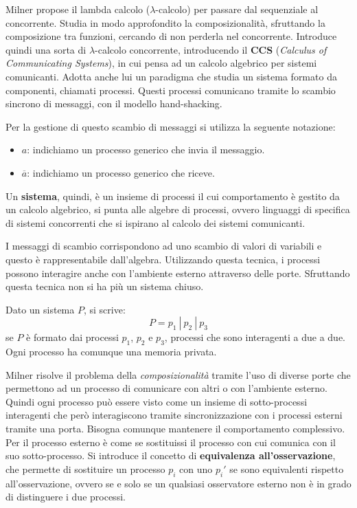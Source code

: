 Milner propose il lambda calcolo ($\lambda$-calcolo) per passare dal sequenziale
al concorrente. Studia in modo approfondito la composizionalità, sfruttando la
composizione tra funzioni, cercando di non perderla nel concorrente.
Introduce quindi una sorta di $\lambda$-calcolo concorrente, introducendo il
\textbf{CCS} (\textit{Calculus of Communicating Systems}), in cui pensa ad un
calcolo algebrico per sistemi comunicanti. Adotta anche lui un paradigma che
studia un sistema formato da componenti, chiamati processi. Questi processi
comunicano tramite lo scambio sincrono di messaggi, con il modello hand-shacking.

Per la gestione di questo scambio di messaggi si utilizza la seguente notazione:
\begin{itemize}
    \item \textbf{$a$}: indichiamo un processo generico che invia il messaggio.
    \item \textbf{$\overline{a}$}: indichiamo un processo generico che riceve.
\end{itemize}
Un \textbf{sistema}, quindi, è un insieme di processi il cui comportamento è gestito da
un calcolo algebrico, si punta alle algebre di processi, ovvero linguaggi di
specifica di sistemi concorrenti che si ispirano al calcolo dei sistemi comunicanti.

I messaggi di scambio corrispondono ad uno scambio di valori di variabili e questo
è rappresentabile dall'algebra. Utilizzando questa tecnica, i processi possono
interagire anche con l'ambiente esterno attraverso delle porte. Sfruttando
questa tecnica non si ha più un sistema chiuso.

Dato un sistema $P$, si scrive:
\begin{equation}
    P = p_1 \ | \ p_2 \ | \ p_3
\end{equation}
se $P$ è formato dai processi $p_1$, $p_2$ e $p_3$, processi che sono interagenti a
due a due. Ogni processo ha comunque una memoria privata.

Milner risolve il problema della \textit{composizionalità} tramite l'uso di diverse porte
che permettono ad un processo di comunicare con altri o con l'ambiente esterno.
Quindi ogni processo può essere visto come un insieme di sotto-processi interagenti
che però interagiscono tramite sincronizzazione con i processi esterni tramite
una porta. Bisogna comunque mantenere il comportamento complessivo. Per il
processo esterno è come se sostituissi il processo con cui comunica con il suo
sotto-processo. Si introduce il concetto di \textbf{equivalenza all'osservazione},
che permette di sostituire un processo $p_i$ con uno $p_i'$ se sono equivalenti
rispetto all'osservazione, ovvero se e solo se un qualsiasi osservatore esterno
non è in grado di distinguere i due processi.

